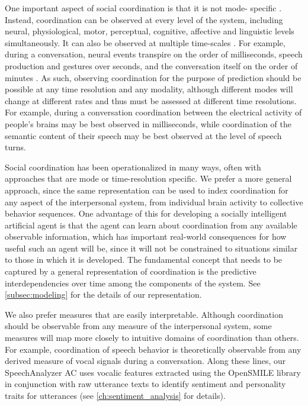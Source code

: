 One important aspect of social coordination is that it is not mode- specific
\citep{eiler2017interaction}. Instead, coordination can be observed at every level of
the system, including neural, physiological, motor, perceptual, cognitive,
affective and linguistic levels simultaneously. It can also be observed at
multiple time-scales \citep{wiltshire2019multiscale}. For example, during a
conversation, neural events transpire on the order of milliseconds, speech
production and gestures over seconds, and the conversation itself on the order
of minutes \citep{hasson2012brain}. As such, observing coordination for the
purpose of prediction should be possible at any time resolution and any
modality, although different modes will change at different rates and thus must
be assessed at different time resolutions. For example, during a conversation
coordination between the electrical activity of people’s brains may be best
observed in milliseconds, while coordination of the semantic content of their
speech may be best observed at the level of speech turns.

Social coordination has been operationalized in many ways, often with
approaches that are mode or time-resolution specific. We prefer a more general
approach, since the same representation can be used to index coordination for
any aspect of the interpersonal system, from individual brain activity to
collective behavior sequences. One advantage of this for developing a socially
intelligent artificial agent is that the agent can learn about coordination
from any available observable information, which has important real-world
consequences for how useful such an agent will be, since it will not be
constrained to situations similar to those in which it is developed. The
fundamental concept that needs to be captured by a general representation of
coordination is the predictive interdependencies over time among the components
of the system. See \autoref{subsec:modeling} for the details of our
representation.

We also prefer measures that are easily interpretable. Although coordination
should be observable from any measure of the interpersonal system, some
measures will map more closely to intuitive domains of coordination than
others. For example, coordination of speech behavior is theoretically
observable from any derived measure of vocal signals during a conversation.
Along these lines, our SpeechAnalyzer AC uses vocalic features extracted using
the OpenSMILE library \cite{eyben2010opensmile} in conjunction with raw
utterance texts to identify sentiment and personality traits for utterances
(see \autoref{ch:sentiment_analysis} for details).

